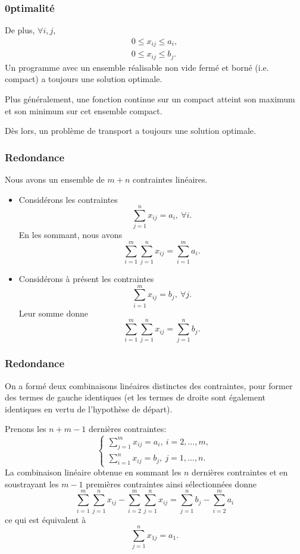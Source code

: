 \documentclass[usepdftitle=false, aspectratio=169]{beamer}
\begin{document}
\begin{frame}
\frametitle{0ptimalité}

De plus, $\forall i, j$,
\begin{align*}
0 \leq x_{ij} \leq a_i, \\
0 \leq x_{ij} \leq b_j.
\end{align*}
Un programme avec un ensemble réalisable non vide fermé et borné (i.e. compact) a toujours une solution optimale.

\mbox{}

Plus généralement, une fonction continue sur un compact atteint son maximum et son minimum sur cet ensemble compact.

\mbox{}

Dès lors, un problème de transport a toujours une solution optimale.

\end{frame}

\begin{frame}
\frametitle{Redondance}

Nous avons un ensemble de $m+n$ contraintes linéaires.
\begin{itemize}
	\item Considérons les contraintes
	$$
	\sum_{j = 1}^n x_{ij} = a_i,\ \forall i.
	$$
	En les sommant, nous avons
	$$
	\sum_{i = 1}^m \sum_{j = 1}^n x_{ij} = \sum_{i = 1}^m a_i.
	$$
	\item Considérons à présent les contraintes
	$$
	\sum_{i = 1}^m x_{ij} = b_j,\ \forall j.
	$$
	Leur somme donne
	$$
	\sum_{i = 1}^m \sum_{j = 1}^n x_{ij} = \sum_{j = 1}^n b_j.
	$$
\end{itemize}

\end{frame}

\begin{frame}
\frametitle{Redondance}

On a formé deux combinaisons linéaires distinctes des contraintes, pour former des termes de gauche identiques (et les termes de droite sont également identiques en vertu de l'hypothèse de départ).

Prenons les $n+m-1$ dernières contraintes:
$$
\begin{cases}
\sum_{j = 1}^m x_{ij} = a_i,\ i = 2,\ldots,m,\\
\sum_{i = 1}^n x_{ij} = b_j,\ j = 1,\ldots,n.
\end{cases}
$$
La combinaison linéaire obtenue en sommant les $n$ dernières contraintes et en soustrayant les $m-1$ premières contraintes ainsi sélectionnées donne
$$
\sum_{i = 1}^m \sum_{j = 1}^n x_{ij} - 
\sum_{i = 2}^m \sum_{j = 1}^n x_{ij}
= \sum_{j =1}^n b_j - \sum_{i = 2}^m a_i
$$
ce qui est équivalent à
$$
\sum_{j = 1}^n x_{1j} = a_1.
$$

\end{frame}
\end{document}
